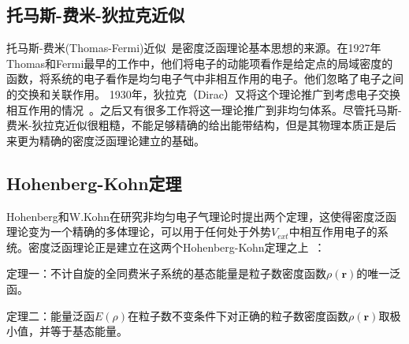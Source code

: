 \subsection{托马斯-费米-狄拉克近似}
托马斯-费米(Thomas-Fermi)近似~\citep{thomas_1927,fermi_1927,dirac_1930}是密度泛函理论基本思想的来源。在1927年Thomas和Fermi最早的工作中，他们将电子的动能项看作是给定点的局域密度的函数，将系统的电子看作是均匀电子气中非相互作用的电子。他们忽略了电子之间的交换和关联作用。
1930年，狄拉克（Dirac）又将这个理论推广到考虑电子交换相互作用的情况~\citep{dirac_1930}。之后又有很多工作将这一理论推广到非均匀体系。尽管托马斯-费米-狄拉克近似很粗糙，不能足够精确的给出能带结构，但是其物理本质正是后来更为精确的密度泛函理论建立的基础。

\subsection{Hohenberg-Kohn定理}
Hohenberg和W.Kohn在研究非均匀电子气理论时提出两个定理\citep{Hohenberg1964}，这使得密度泛函理论变为一个精确的多体理论，可以用于任何处于外势$V_{ext}$中相互作用电子的系统。密度泛函理论正是建立在这两个Hohenberg-Kohn定理之上~\citep{Hohenberg1964}：

定理一：不计自旋的全同费米子系统的基态能量是粒子数密度函数$\rho(\mathbf{r})$的唯一泛函。

定理二：能量泛函$E(\rho)$在粒子数不变条件下对正确的粒子数密度函数$\rho(\mathbf{r})$取极小值，并等于基态能量。

